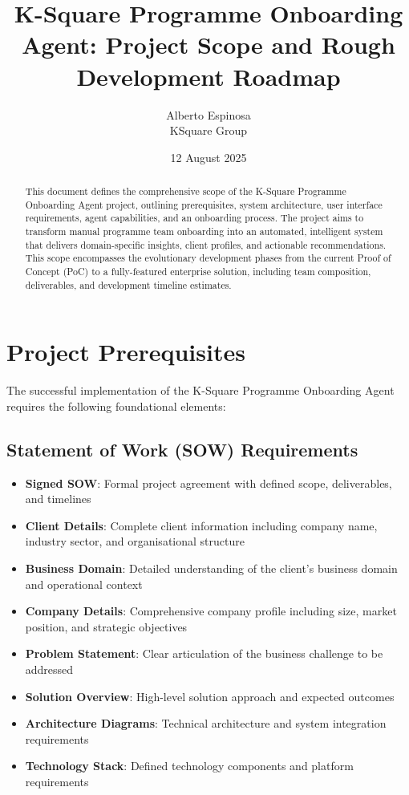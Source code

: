 \documentclass{article}
\begin{document}
\title{K-Square Programme Onboarding Agent: Project Scope and Rough Development Roadmap}
\author{Alberto Espinosa \\ KSquare Group}
\date{12 August 2025}
\maketitle

\begin{abstract}
This document defines the comprehensive scope of the K-Square Programme Onboarding Agent project, 
outlining prerequisites, system architecture, user interface requirements, agent capabilities, 
and an onboarding process. The project aims to transform manual programme team onboarding into an 
automated, intelligent system that delivers domain-specific insights, client profiles, and actionable 
recommendations. This scope encompasses the evolutionary development phases from the 
current Proof of Concept (PoC) to a fully-featured enterprise solution, including team composition, deliverables, 
and development timeline estimates.
\end{abstract}

\section{Project Prerequisites}
The successful implementation of the K-Square Programme Onboarding Agent requires 
the following foundational elements:

\subsection{Statement of Work (SOW) Requirements}
\begin{itemize}
    \item \textbf{Signed SOW}: Formal project agreement with defined scope, deliverables, and timelines
    \item \textbf{Client Details}: Complete client information including company name, industry sector, and organisational structure
    \item \textbf{Business Domain}: Detailed understanding of the client's business domain and operational context
    \item \textbf{Company Details}: Comprehensive company profile including size, market position, and strategic objectives
    \item \textbf{Problem Statement}: Clear articulation of the business challenge to be addressed
    \item \textbf{Solution Overview}: High-level solution approach and expected outcomes
    \item \textbf{Architecture Diagrams}: Technical architecture and system integration requirements
    \item \textbf{Technology Stack}: Defined technology components and platform requirements
\end{itemize}
\end{document}

